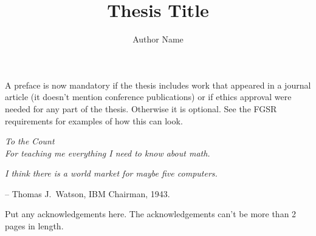 \documentclass[12pt]{report}          %
\title{Thesis Title} %
\author{Author Name}
\begin{document}
\preamblepagenumbering %
\titlepage %



\doublespacing


\begin{preface} 
A preface is now mandatory if the thesis includes work that appeared in a journal article (it doesn't mention conference publications) or if ethics approval were needed for any part of the thesis.
Otherwise it is optional.
See the FGSR requirements for examples of how this can look.
\end{preface}


\begin{dedication}
	\vspace*{1in}
	\begin{center}
	         \emph{To the Count} \\
             \emph{For teaching me everything I need to know about math.}
	\end{center}
\end{dedication}

\begin{quotepage}
 \vspace*{1in}
 \begin{center}
	\emph{I think there is a world market for maybe five computers.}
	\begin{flushright}
		-- Thomas J.\ Watson, IBM Chairman, 1943.
	\end{flushright}
 \end{center}
\end{quotepage}

\begin{acknowledgements} 
Put any acknowledgements here.
The acknowledgements can't be more than 2 pages in length.
\end{acknowledgements}

\singlespacing %
               
\end{document}
